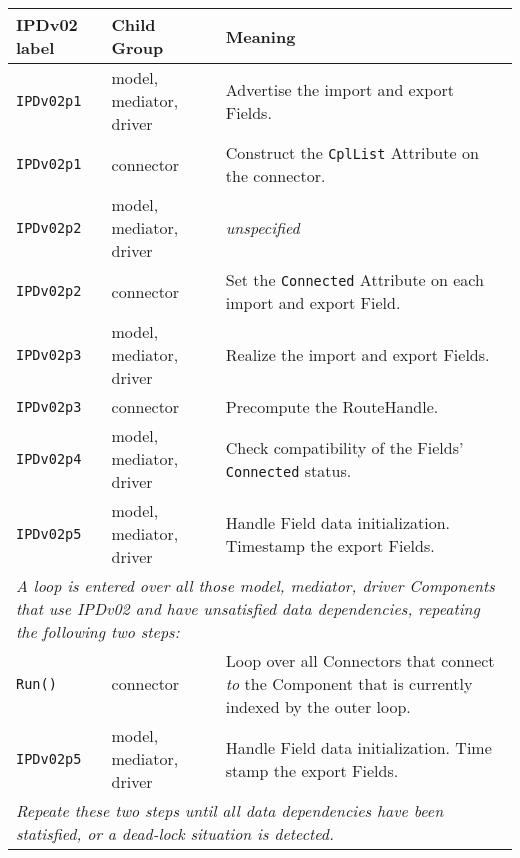 \vspace*{3ex}
\begin{tabular}[h]{|p{35mm}|p{4cm}|p{6cm}|}
     \hline\hline
     {\bf IPDv02 label} & {\bf Child Group} & {\bf Meaning}\\
     \hline\hline
     {\tt IPDv02p1} & model, mediator, driver & Advertise the import and export Fields.\\ \hline
     {\tt IPDv02p1} & connector               & Construct the {\tt CplList} Attribute on the connector.\\ \hline
     {\tt IPDv02p2} & model, mediator, driver & {\em unspecified}\\ \hline
     {\tt IPDv02p2} & connector               & Set the {\tt Connected} Attribute on each import and export Field.\\ \hline
     {\tt IPDv02p3} & model, mediator, driver & Realize the import and export Fields.\\ \hline
     {\tt IPDv02p3} & connector               & Precompute the RouteHandle.\\ \hline
     {\tt IPDv02p4} & model, mediator, driver & Check compatibility of the Fields' {\tt Connected} status.\\ \hline
     {\tt IPDv02p5} & model, mediator, driver & Handle Field data initialization. Timestamp the export Fields.\\ \hline
     \multicolumn{3}{|p{13.5cm}|}{\it A loop is entered over all those model, mediator, driver Components that use IPDv02 and have
     unsatisfied data dependencies, repeating the following two steps:}\\ \hline
     {\tt Run()}    & connector               & Loop over all Connectors that connect {\it to} the Component that is currently indexed by the outer loop.\\ \hline
     {\tt IPDv02p5} & model, mediator, driver & Handle Field data initialization. Time stamp the export Fields.\\ \hline
     \multicolumn{3}{|p{13.5cm}|}{\it Repeate these two steps until all data
     dependencies have been statisfied, or a dead-lock situation is detected.}\\ 
     \hline\hline
\end{tabular}\newline
